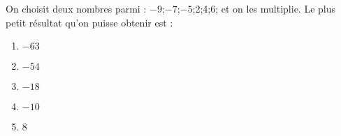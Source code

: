 On choisit deux nombres parmi : $-9$;$-7$;$-5$;2;4;6; et on les multiplie. Le plus petit résultat qu'on puisse obtenir est :
\begin{multicols}{5}
  \begin{enumerate}[A/]
  \item $-63$
  \item $-54$
  \item $-18$
  \item $-10$
  \item 8
  \end{enumerate}
\end{multicols}